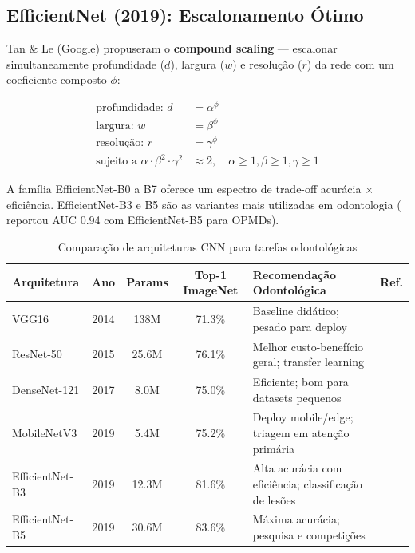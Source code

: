 \subsection{EfficientNet (2019): Escalonamento Ótimo}

Tan \& Le (Google) propuseram o \textbf{compound scaling} --- escalonar
simultaneamente profundidade ($d$), largura ($w$) e resolução ($r$) da rede
com um coeficiente composto $\phi$:

\begin{align}
  \text{profundidade: } d &= \alpha^\phi \label{eq:eff-depth} \\
  \text{largura: } w &= \beta^\phi \label{eq:eff-width} \\
  \text{resolução: } r &= \gamma^\phi \label{eq:eff-res} \\
  \text{sujeito a } \alpha \cdot \beta^2 \cdot \gamma^2 &\approx 2, \quad
    \alpha \geq 1, \beta \geq 1, \gamma \geq 1 \label{eq:eff-constraint}
\end{align}

A família EfficientNet-B0 a B7 oferece um espectro de trade-off acurácia $\times$
eficiência. EfficientNet-B3 e B5 são as variantes mais utilizadas em odontologia
( reportou AUC 0.94 com EfficientNet-B5 para OPMDs).

\begin{table}[H]
  \centering
  \caption{Comparação de arquiteturas CNN para tarefas odontológicas}
  \label{tab:cnn-comparison}
  \begin{tabularx}{\textwidth}{lccclX}
    \toprule
    \textbf{Arquitetura} & \textbf{Ano} & \textbf{Params} & \textbf{Top-1 ImageNet} & \textbf{Recomendação Odontológica} & \textbf{Ref.} \\
    \midrule
    VGG16 & 2014 & 138M & 71.3\% & Baseline didático; pesado para deploy & \cite{DL-ODT-001} \\
    ResNet-50 & 2015 & 25.6M & 76.1\% & Melhor custo-benefício geral; transfer learning & \cite{ODT-026} \\
    DenseNet-121 & 2017 & 8.0M & 75.0\% & Eficiente; bom para datasets pequenos & \cite{ODT-021} \\
    MobileNetV3 & 2019 & 5.4M & 75.2\% & Deploy mobile/edge; triagem em atenção primária & \cite{ODT-022} \\
    EfficientNet-B3 & 2019 & 12.3M & 81.6\% & Alta acurácia com eficiência; classificação de lesões & \cite{ODT-011} \\
    EfficientNet-B5 & 2019 & 30.6M & 83.6\% & Máxima acurácia; pesquisa e competições & \cite{ODT-013} \\
    \bottomrule
  \end{tabularx}
\end{table}

